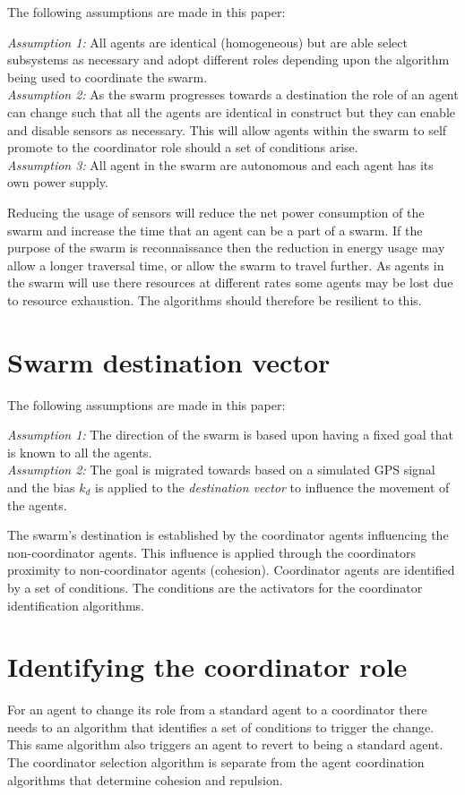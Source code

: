 \documentclass{ieeeaccess}
\begin{document}
The following assumptions are made in this paper:

\textit{Assumption 1:} All agents are identical (homogeneous) but are able select subsystems as necessary and adopt different roles depending upon the algorithm being used to coordinate the swarm. \\
\textit{Assumption 2:} As the swarm progresses towards a destination the role of an agent can change such that all the agents are identical in construct but they can enable and disable sensors as necessary. This will allow agents within the swarm to self promote to the coordinator role should a set of conditions arise.\\
\textit{Assumption 3:} All agent in the swarm are autonomous and each agent has its own power supply. 

Reducing the usage of sensors will reduce the net power consumption of the swarm and increase the time that an agent can be a part of a swarm. If the purpose of the swarm is reconnaissance then the reduction in energy usage may allow a longer traversal time, or allow the swarm to travel further. As agents in the swarm will use there resources at different rates some agents may be lost due to resource exhaustion. The algorithms should therefore be resilient to this.

\section{Swarm destination vector}
The following assumptions are made in this paper:

\textit{Assumption 1:} The direction of the swarm is based upon having a fixed goal that is known to all the agents. \\
\textit{Assumption 2:} The goal is migrated towards based on a simulated GPS signal and the bias $k_d$ is applied to the \textit{destination vector} to influence the movement of the agents. 

The swarm's destination is established by the coordinator agents influencing the non-coordinator agents. This influence is applied through the coordinators proximity to non-coordinator agents (cohesion). Coordinator agents are identified by a set of conditions. The conditions are the activators for the coordinator identification algorithms.

\section{Identifying the coordinator role}
For an agent to change its role from a standard agent to a coordinator there needs to an algorithm that identifies a set of conditions to trigger the change. This same algorithm also triggers an agent to revert to being a standard agent. The coordinator selection algorithm is separate from the agent coordination algorithms that determine cohesion and repulsion.
\end{document}

